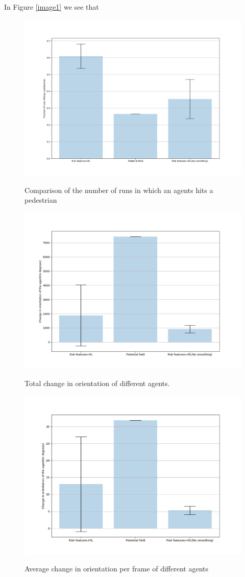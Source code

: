 In Figure \ref{image1} we see that
\begin{figure}
	\centering
	\caption{Comparison of the number of runs in which an agents hits a pedestrian}
	\includegraphics[width=0.6\linewidth]{plots/inter_method/hit_pedestrian.png}
	\label{fig:inter_method-hit_pedestrian}
\end{figure}

\begin{figure}
	\centering
	\caption{Total change in orientation of different agents.}
	\includegraphics[width=0.6\linewidth]{plots/inter_method/change_in_orientation_total.png}
	\label{fig:inter_method-change_in_orientation_total}
\end{figure}


\begin{figure}
	\centering
	\caption{Average change in orientation per frame of different agents}
	\includegraphics[width=0.6\linewidth]{plots/inter_method/change_in_orientation_avg.png}
	\label{fig:inter_method-change_in_orientation_avg}
\end{figure}


